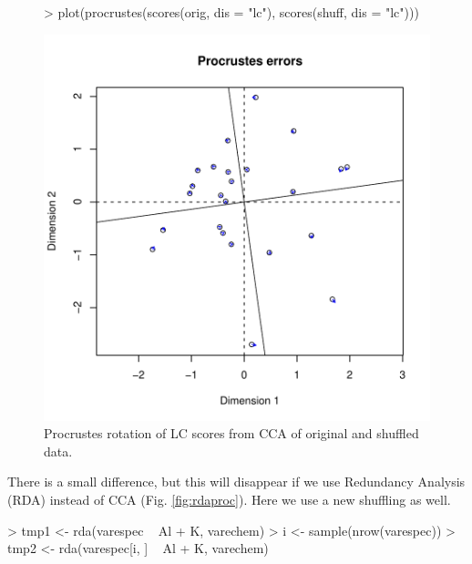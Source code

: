 \documentclass[a4paper]{article}
\begin{document}
\begin{figure}
\begin{center}
\begin{Schunk}
\begin{Sinput}
> plot(procrustes(scores(orig, dis = "lc"), scores(shuff, dis = "lc")))
\end{Sinput}
\end{Schunk}
\includegraphics{vegan-FAQ-005}
\caption{Procrustes rotation of LC scores from CCA of original and shuffled data.} 
\label{fig:ccaproc}
\end{center}
\end{figure}
There is a small difference, but this will disappear if we use
Redundancy Analysis (RDA) instead of CCA
(Fig. \ref{fig:rdaproc}). Here we use a new shuffling as well.
\begin{Schunk}
\begin{Sinput}
> tmp1 <- rda(varespec ~ Al + K, varechem)
> i <- sample(nrow(varespec))
> tmp2 <- rda(varespec[i, ] ~ Al + K, varechem)
\end{Sinput}
\end{Schunk}
\end{document}
